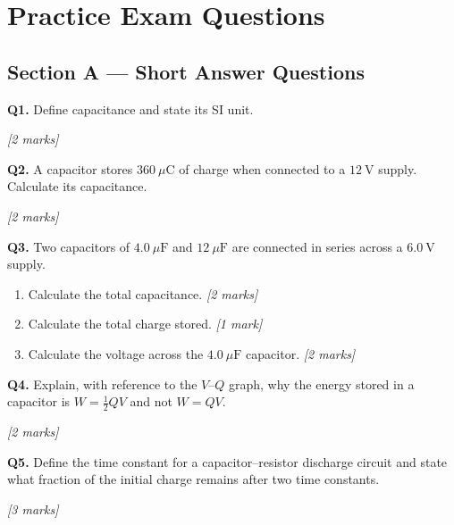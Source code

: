 \section{Practice Exam Questions}

\subsection*{Section A — Short Answer Questions}

\begin{tcolorbox}[colback=white, colframe=midblue, breakable]

\begin{minipage}{\linewidth}
\textbf{Q1.} Define capacitance and state its SI unit.
\par\hfill\textit{[2 marks]}
\vspace{2.5cm}
\end{minipage}

\begin{minipage}{\linewidth}
\textbf{Q2.} A capacitor stores $360\ \mu\text{C}$ of charge when connected to a $12\ \text{V}$ supply. Calculate its capacitance.
\par\hfill\textit{[2 marks]}
\vspace{2.5cm}
\end{minipage}

\begin{minipage}{\linewidth}
\textbf{Q3.} Two capacitors of $4.0\ \mu\text{F}$ and $12\ \mu\text{F}$ are connected in series across a $6.0\ \text{V}$ supply.
\begin{enumerate}[label=(\alph*)]
  \item Calculate the total capacitance. \hfill\textit{[2 marks]}
  \vspace{2.5cm}
  \item Calculate the total charge stored. \hfill\textit{[1 mark]}
  \vspace{2cm}
  \item Calculate the voltage across the $4.0\ \mu\text{F}$ capacitor. \hfill\textit{[2 marks]}
  \vspace{2.5cm}
\end{enumerate}
\end{minipage}

\begin{minipage}{\linewidth}
\textbf{Q4.} Explain, with reference to the $V$–$Q$ graph, why the energy stored in a capacitor is $W = \tfrac{1}{2}QV$ and not $W = QV$.
\par\hfill\textit{[2 marks]}
\vspace{3cm}
\end{minipage}

\begin{minipage}{\linewidth}
\textbf{Q5.} Define the time constant for a capacitor–resistor discharge circuit and state what fraction of the initial charge remains after two time constants.
\par\hfill\textit{[3 marks]}
\vspace{3cm}
\end{minipage}

\end{tcolorbox}

